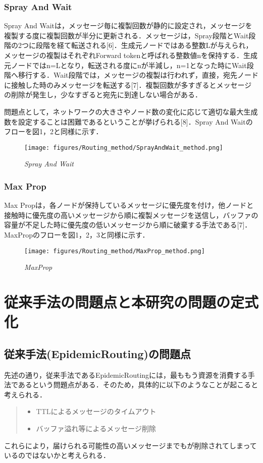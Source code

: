 \documentclass[11pt]{icsthesis}
\begin{document}
\subsection{Spray And Wait}
Spray And Waitは，メッセージ毎に複製回数が静的に設定され，メッセージを複製する度に複製回数が半分に更新される．メッセージは，Spray段階とWait段階の2つに段階を経て転送される[6]．生成元ノードではある整数Lが与えられ，メッセージの複製はそれぞれForward tokenと呼ばれる整数値nを保持する．生成元ノードではn=Lとなり，転送される度にnが半減し，n=1となった時にWait段階へ移行する．Wait段階では，メッセージの複製は行われず，直接，宛先ノードに接触した時のみメッセージを転送する[7]．複製回数が多すぎるとメッセージの削除が発生し，少なすぎると宛先に到達しない場合がある．

問題点として，ネットワークの大きさやノード数の変化に応じて適切な最大生成数を設定することは困難であるということが挙げられる[8]．Spray And Waitのフローを図1，2と同様に示す．

\begin{figure}[h]
	\centering
	\texttt{[image: figures/Routing\_method/SprayAndWait\_method.png]}
	\caption[]{\it{Spray And Wait}}
	\label{SprayAndWait}
\end{figure}

\newpage

\subsection{Max Prop}
Max Propは，各ノードが保持しているメッセージに優先度を付け，他ノードと接触時に優先度の高いメッセージから順に複製メッセージを送信し，バッファの容量が不足した時に優先度の低いメッセージから順に破棄する手法である[7]．MaxPropのフローを図1，2，3と同様に示す．

\begin{figure}[h]
	\centering
	\texttt{[image: figures/Routing\_method/MaxProp\_method.png]}
	\caption[]{\it{MaxProp}}
	\label{MaxProp}
\end{figure}

\chapter{従来手法の問題点と本研究の問題の定式化}
\section{従来手法(EpidemicRouting)の問題点}
先述の通り，従来手法であるEpidemicRoutingには，最ももう資源を消費する手法であるという問題点がある．そのため，具体的に以下のようなことが起こると考えられる．
\begin{quote}
\begin{itemize}
\item TTLによるメッセージのタイムアウト
\item バッファ溢れ等によるメッセージ削除
\end{itemize}
\end{quote}
これらにより，届けられる可能性の高いメッセージまでもが削除されてしまっているのではないかと考えられる．
\end{document}
